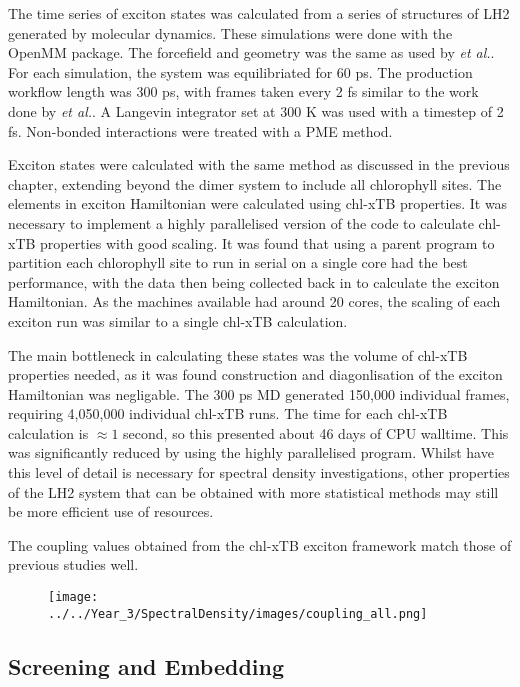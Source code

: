 The time series of exciton states was calculated from a series of structures of 
LH2 generated by molecular dynamics. These simulations were done with the OpenMM 
package. The forcefield and geometry was the same as used by \emph{et al.}. For 
each simulation, the system was equilibriated for 60 ps. The production workflow 
length was 300 ps, with frames taken every 2 fs similar to the work done by \emph{et al.}.
A Langevin integrator set at 300 K was used with a timestep of 2 fs. Non-bonded
interactions were treated with a PME method.

Exciton states were calculated with the same method as discussed in the previous 
chapter, extending beyond the dimer system to include all chlorophyll sites. The
elements in exciton Hamiltonian were calculated using chl-xTB properties. It was
necessary to implement a highly parallelised version of the code to calculate chl-xTB
properties with good scaling. It was found that using a parent program to partition
each chlorophyll site to run in serial on a single core had the best performance,
with the data then being collected back in to calculate the exciton Hamiltonian.
As the machines available had around 20 cores, the scaling of each exciton run was
similar to a single chl-xTB calculation.

The main bottleneck in calculating these states was the volume of chl-xTB properties
needed, as it was found construction and diagonlisation of the exciton Hamiltonian
was negligable. The 300 ps MD generated 150,000 individual frames, requiring 4,050,000
individual chl-xTB runs. The time for each chl-xTB calculation is $\approx 1$ second,
so this presented about 46 days of CPU walltime. This was significantly reduced 
by using the highly parallelised program. Whilst have this level of detail is necessary
for spectral density investigations, other properties of the LH2 system that can
be obtained with more statistical methods may still be more efficient use of resources.

The coupling values obtained from the chl-xTB exciton framework match those of previous
studies well.

\begin{figure}
    \centering
    \texttt{[image: ../../Year\_3/SpectralDensity/images/coupling\_all.png]}
\end{figure}

\subsection{Screening and Embedding}
\label{subsec:screening}

